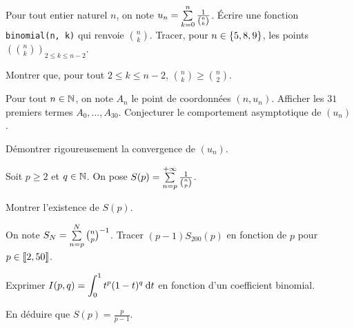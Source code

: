 \documentclass[oneside,11pt]{book}
\begin{document}
\begin{exercice}%
%
%
%
Pour tout entier naturel $n$, on note $u_n = \sum\limits_{k=0}^n \frac{1}{\binom{n}{k}}$.
\qu Écrire une fonction \verb?binomial(n, k)? qui renvoie $\binom{n}{k}$. Tracer, pour $n \in \left\{5, 8, 9\right\}$, les points $\left(\binom{n}{k}\right)_{2\leq k \leq n-2}$.

\qu Montrer que, pour tout $2 \leq k \leq n-2$, $\binom{n}{k} \geq \binom{n}{2}$.

\qu Pour tout $n \in \mathbb{N}$, on note $A_n$ le point de coordonnées $(n, u_n)$. Afficher les $31$ premiers termes $A_0,\ldots,A_{30}$. Conjecturer le comportement asymptotique de $(u_n)$.

\qu Démontrer rigoureusement la convergence de $(u_n)$.

Soit $p \geq 2$ et $q \in \mathbb{N}$. On pose $S(p) = \sum\limits_{n=p}^{+\infty} \frac{1}{\binom{n}{p}}$.

\qu Montrer l'existence de $S(p)$.

\qu On note $S_N = \sum\limits_{n=p}^N \binom{n}{p}^{-1}$. Tracer $(p-1) S_{200}(p)$ en fonction de $p$ pour $p \in \llbracket2,50\rrbracket$.

\qu Exprimer $I(p, q) = \displaystyle \int_0^1 t^p (1 - t)^q \:{\text d}t$ en fonction d'un coefficient binomial.

\qu En déduire que $S(p) = \frac{p}{p-1}$.
\end{exercice}

\npagecorr
\end{document}

